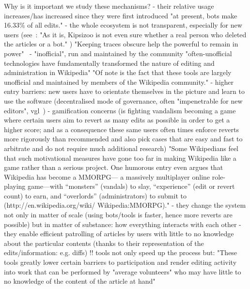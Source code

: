 Why is it important we study these mechanisms?
- their relative usage increases/has increased since they were first introduced
    \cite{GeiRib2010}
    "at present, bots make 16.33\% of all edits."
- the whole ecosystem is not transparent, especially for new users (see~\cite{ForGei2012}: "As it is, Kipsizoo is not even
sure whether a real person who deleted the articles or a bot." )
"Keeping traces obscure help the powerful to remain in power"~\cite{ForGei2012}
- "inofficial", run and maintained by the community
    \cite{GeiRib2010}
    "often-unofficial technologies have fundamentally
    transformed the nature of editing and administration in
    Wikipedia"
    "Of note is the fact that these tools are largely
    unofficial and maintained by members of the Wikipedia
    community."
- higher entry barriers: new users have to orientate themselves in the picture and learn to use the software (decentralised mode of governance, often "impenetrable for new editors", vgl~\cite{ForGei2012})
- gamification concerns (is fighting vandalism becoming a game where certain users aim to revert as many edits as possible in order to get a higher score; and as a consequence these same users often times enforce reverts more rigorously than recommended and also pick cases that are easy and fast to arbitrate and do not require much additional research)
    \cite{HalRied2012}
    "Some Wikipedians feel that such
    motivational measures have gone
    too far in making Wikipedia like a
    game rather than a serious project.
    One humorous entry even argues that
    Wikipedia has become a MMORPG—
    a massively multiplayer online role-
    playing game—with “monsters”
    (vandals) to slay, “experience”
    (edit or revert count) to earn, and
    “overlords” (administrators) to submit
    to (http://en.wikipedia.org/wiki/
    Wikipedia:MMORPG)."
- they change the system not only in matter of scale (using bots/tools is faster, hence more reverts are possible) but in matter of substance: how everything interacts with each other
- they enable efficient patrolling of articles by users with little to no knowledge about the particular contents (thanks to their representation of the edits/information: e.g. diffs)
    \cite{GeiRib2010}
    !! tools not only speed up the process but:
    "These tools greatly lower certain barriers to participation and render editing
    activity into work that can be performed by "average
    volunteers" who may have little to no knowledge of the
    content of the article at hand"


